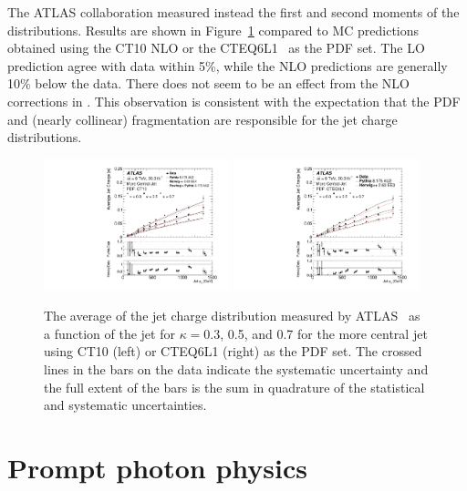 \documentclass{PoS}
\begin{document}
The ATLAS collaboration measured instead the first and second moments of the
distributions. Results are shown in Figure~\ref{fig:jetcharge}
compared to MC predictions obtained using the CT10 NLO or the 
CTEQ6L1~\cite{Pumplin:2002vw} as the PDF set. The LO prediction agree with data within 5\%, while the NLO predictions are generally
10\% below the data. There does not seem to be an effect from the NLO corrections in \POWHEG.   
This observation is consistent with the expectation that the PDF and (nearly collinear) fragmentation
are responsible for the jet charge distributions.    
\begin{figure}[hbtp]
  \centering
  \includegraphics[width=0.48\textwidth]{Figure10a.pdf}
  \includegraphics[width=0.48\textwidth]{Figure10b.pdf}
  \caption{The average of the jet charge distribution measured by
    ATLAS~\cite{Aad:2015cua} as a function of the jet
    \pt for $\kappa=$0.3, 0.5, and 0.7 for the more central jet using CT10 (left) or CTEQ6L1 (right) as the PDF set. The crossed lines in the
    bars on the data indicate the systematic uncertainty and the full extent of the bars is the sum in quadrature of the
    statistical and systematic uncertainties. } 
  \label{fig:jetcharge}
\end{figure}


\section{Prompt photon physics}
\end{document}
